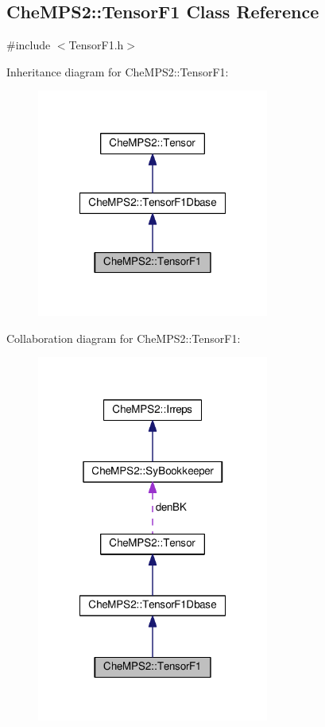 \hypertarget{classCheMPS2_1_1TensorF1}{\subsection{Che\-M\-P\-S2\-:\-:Tensor\-F1 Class Reference}
\label{classCheMPS2_1_1TensorF1}
}


{\ttfamily \#include $<$Tensor\-F1.\-h$>$}



Inheritance diagram for Che\-M\-P\-S2\-:\-:Tensor\-F1\-:\nopagebreak
\begin{figure}[H]
\begin{center}
\leavevmode
\includegraphics[width=216pt]{classCheMPS2_1_1TensorF1__inherit__graph}
\end{center}
\end{figure}


Collaboration diagram for Che\-M\-P\-S2\-:\-:Tensor\-F1\-:\nopagebreak
\begin{figure}[H]
\begin{center}
\leavevmode
\includegraphics[width=216pt]{classCheMPS2_1_1TensorF1__coll__graph}
\end{center}
\end{figure}

